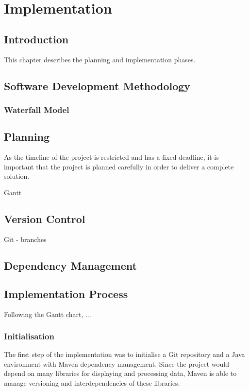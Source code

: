 \chapter{Implementation}
\label{ch:implementation}
\section{Introduction}
This chapter describes the planning and implementation phases.

\section{Software Development Methodology}
\subsection{Waterfall Model}
\subsection{}

\section{Planning}
As the timeline of the project is restricted and has a fixed deadline, it is important that the project is planned carefully in order to deliver a complete solution.

Gantt


\section{Version Control}
Git - branches

\section{Dependency Management}

\section{Implementation Process}
Following the Gantt chart, ...

\subsection{Initialisation}
The first step of the implementation was to initialise a Git repository and a Java environment with Maven dependency management. Since the project would depend on many libraries for displaying and processing data, Maven is able to manage versioning and interdependencies of these libraries.

